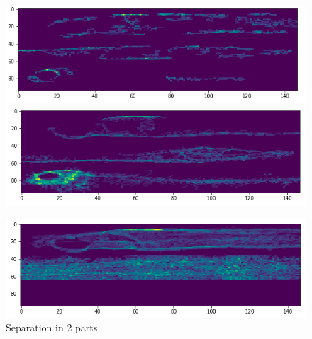 \documentclass[9pt]{beamer}
\begin{document}
\begin{frame}
\begin{figure}
\centering
\begin{minipage}{.5\textwidth}
  \centering
  \includegraphics[scale=0.3]{Images/35_fishes_separation}
\end{minipage}%
\begin{minipage}{.5\textwidth}
  \centering
  \includegraphics[scale=0.3]{Images/3_fishes_separation}
\end{minipage}
\end{figure}
\begin{figure}
\includegraphics[scale=0.3]{Images/2_fishes_separation}
\caption{Separation in 2 parts}
\end{figure}
\end{frame}
\end{document}
